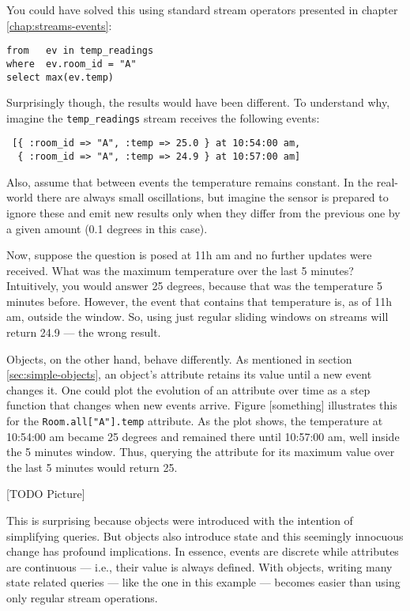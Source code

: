 \documentclass{report}
\begin{document}
You could have solved this using standard stream operators presented
in chapter \ref{chap:streams-events}:

\begin{verbatim}
from   ev in temp_readings
where  ev.room_id = "A"
select max(ev.temp)
\end{verbatim}

Surprisingly though, the results would have been different. To
understand why, imagine the \verb=temp_readings= stream receives the
following events:

\begin{verbatim}
 [{ :room_id => "A", :temp => 25.0 } at 10:54:00 am,
  { :room_id => "A", :temp => 24.9 } at 10:57:00 am]
\end{verbatim}

Also, assume that between events the temperature remains constant. In
the real-world there are always small oscillations, but imagine the
sensor is prepared to ignore these and emit new results only when they
differ from the previous one by a given amount (0.1 degrees in this
case).

Now, suppose the question is posed at 11h am and no further updates
were received. What was the maximum temperature over the last 5
minutes? Intuitively, you would answer 25 degrees, because that was
the temperature 5 minutes before. However, the event that contains
that temperature is, as of 11h am, outside the window. So, using just
regular sliding windows on streams will return 24.9 --- the wrong
result.

Objects, on the other hand, behave differently. As mentioned in
section \ref{sec:simple-objects}, an object's attribute retains its
value until a new event changes it. One could plot the evolution of an
attribute over time as a step function that changes when new events
arrive. Figure [something] illustrates this for the
\verb=Room.all["A"].temp= attribute. As the plot shows, the
temperature at 10:54:00 am became 25 degrees and remained there until
10:57:00 am, well inside the 5 minutes window. Thus, querying the
attribute for its maximum value over the last 5 minutes would return
25.

[TODO Picture]

This is surprising because objects were introduced with the intention
of simplifying queries. But objects also introduce state and this
seemingly innocuous change has profound implications. In essence,
events are discrete while attributes are continuous --- i.e., their
value is always defined. With objects, writing many state related
queries --- like the one in this example --- becomes easier than using
only regular stream operations.
\end{document}

